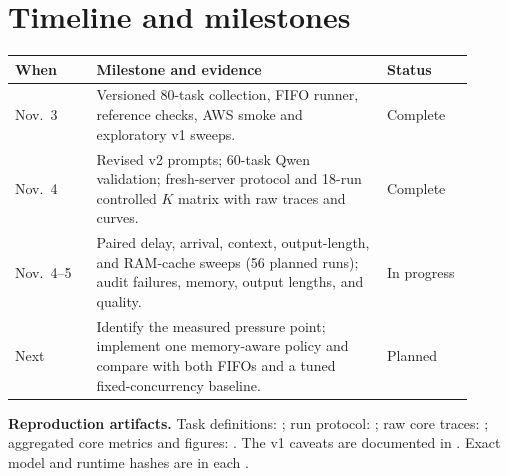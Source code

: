 \documentclass[10pt,letterpaper]{article}
\begin{document}
\clearpage
\appendix
\section{Timeline and milestones}
\begin{tabular}{@{}p{0.16\linewidth}p{0.58\linewidth}p{0.17\linewidth}@{}}
\toprule
When & Milestone and evidence & Status \\
\midrule
Nov.\ 3 & Versioned 80-task collection, FIFO runner, reference checks,
AWS smoke and exploratory v1 sweeps. & Complete \\
Nov.\ 4 & Revised v2 prompts; 60-task Qwen validation; fresh-server
protocol and 18-run controlled $K$ matrix with raw traces and curves. & Complete \\
Nov.\ 4--5 & Paired delay, arrival, context, output-length, and RAM-cache
sweeps (56 planned runs); audit failures, memory, output lengths, and quality. & In progress \\
Next & Identify the measured pressure point; implement one memory-aware
policy and compare with both FIFOs and a tuned fixed-concurrency baseline. & Planned \\
\bottomrule
\end{tabular}

\vspace{6pt}
\textbf{Reproduction artifacts.} Task definitions:
; run protocol:
; raw core traces:
; aggregated core metrics and figures:
. The v1 caveats are documented in
. Exact model and runtime hashes are in each
.
\end{document}
